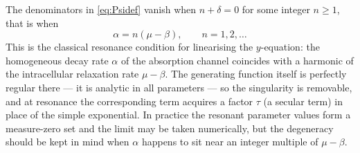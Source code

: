\begin{remark}[Resonance]
\label{rem:resonance}
The denominators in \cref{eq:Psidef} vanish when $n+\delta=0$ for some integer
$n\ge1$, that is when
\begin{equation*}
\alpha = n(\mu-\beta),\qquad n = 1,2,\dots
\end{equation*}
This is the classical resonance condition for linearising the $y$-equation: the
homogeneous decay rate $\alpha$ of the absorption channel coincides with a harmonic
of the intracellular relaxation rate $\mu-\beta$. The generating function itself is
perfectly regular there --- it is analytic in all parameters --- so the singularity is
removable, and at resonance the corresponding term acquires a factor $\tau$ (a
secular term) in place of the simple exponential. In practice the resonant parameter
values form a measure-zero set and the limit may be taken numerically, but the
degeneracy should be kept in mind when $\alpha$ happens to sit near an integer
multiple of $\mu-\beta$.
\end{remark}

\FloatBarrier

